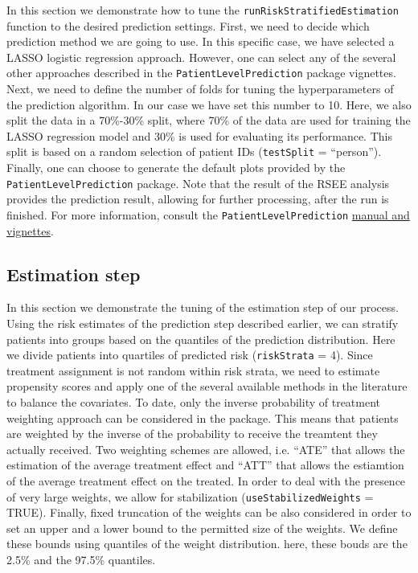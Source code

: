 \documentclass[]{article}
\begin{document}
In this section we demonstrate how to tune the
\texttt{runRiskStratifiedEstimation} function to the desired prediction
settings. First, we need to decide which prediction method we are going
to use. In this specific case, we have selected a LASSO logistic
regression approach. However, one can select any of the several other
approaches described in the \texttt{PatientLevelPrediction} package
vignettes. Next, we need to define the number of folds for tuning the
hyperparameters of the prediction algorithm. In our case we have set
this number to 10. Here, we also split the data in a 70\%-30\% split,
where 70\% of the data are used for training the LASSO regression model
and 30\% is used for evaluating its performance. This split is based on
a random selection of patient IDs (\texttt{testSplit} = ``person'').
Finally, one can choose to generate the default plots provided by the
\texttt{PatientLevelPrediction} package. Note that the result of the
RSEE analysis provides the prediction result, allowing for further
processing, after the run is finished. For more information, consult the
\texttt{PatientLevelPrediction}
\href{https://github.com/OHDSI/PatientLevelPrediction}{manual and
vignettes}.

\hypertarget{estimation-step}{%
\subsection{Estimation step}\label{estimation-step}}

In this section we demonstrate the tuning of the estimation step of our
process. Using the risk estimates of the prediction step described
earlier, we can stratify patients into groups based on the quantiles of
the prediction distribution. Here we divide patients into quartiles of
predicted risk (\texttt{riskStrata} = 4). Since treatment assignment is
not random within risk strata, we need to estimate propensity scores and
apply one of the several available methods in the literature to balance
the covariates. To date, only the inverse probability of treatment
weighting approach can be considered in the package. This means that
patients are weighted by the inverse of the probability to receive the
treamtent they actually received. Two weighting schemes are allowed,
i.e. ``ATE'' that allows the estimation of the average treatment effect
and ``ATT'' that allows the estiamtion of the average treatment effect
on the treated. In order to deal with the presence of very large
weights, we allow for stabilization (\texttt{useStabilizedWeights} =
TRUE). Finally, fixed truncation of the weights can be also considered
in order to set an upper and a lower bound to the permitted size of the
weights. We define these bounds using quantiles of the weight
distribution. here, these bouds are the 2.5\% and the 97.5\% quantiles.
\end{document}
